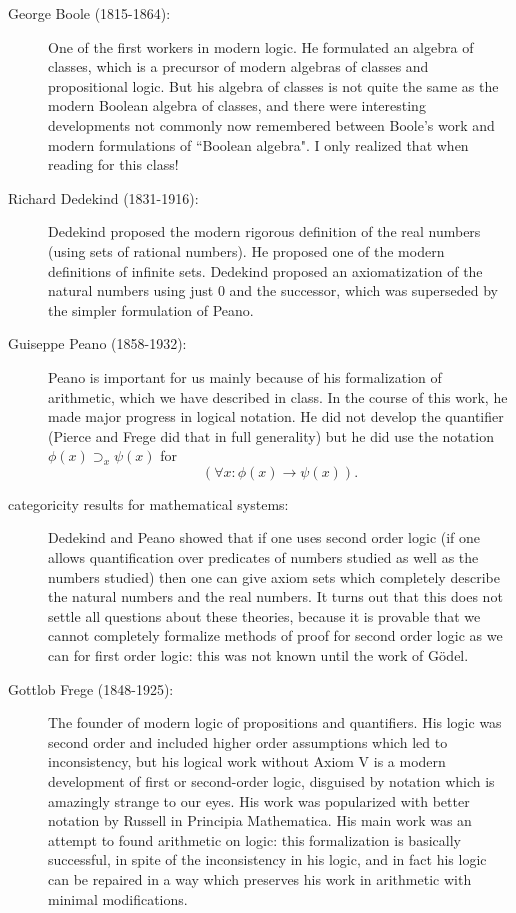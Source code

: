 \documentclass[12pt]{article}
\begin{document}
\begin{description}
\item[George Boole (1815-1864):]  One of the first workers in modern logic.  He formulated an algebra of classes, which is a precursor of modern algebras of classes and propositional logic.
But his algebra of classes is not quite the same as the modern Boolean algebra of classes, and there were interesting developments not commonly now remembered between Boole's work and modern formulations of ``Boolean algebra".  I only realized that when reading for this class!

\item[Richard Dedekind (1831-1916):]  Dedekind proposed the modern rigorous definition of the real numbers (using sets of rational numbers).  He proposed one of the modern definitions of infinite sets.  Dedekind proposed an axiomatization of the natural numbers using just 0 and the successor, which was superseded by the simpler formulation of Peano.

\item[Guiseppe Peano (1858-1932):]  Peano is important for us mainly because of his formalization of arithmetic, which we have described in class.  In the course of this work, he made major progress in logical notation.  He did not develop the quantifier (Pierce and Frege did that in full generality) but he did use the notation $\phi(x) \supset_x \psi(x)$ for $$(\forall x:\phi(x) \rightarrow \psi(x)).$$

\item[categoricity results for mathematical systems:]  Dedekind and Peano showed that if one uses second order logic (if one allows quantification over predicates of numbers studied as well as the numbers studied) then one can give axiom sets which completely describe the natural numbers and the real numbers.  It turns out that this does not settle all questions about these theories, because it is provable that we cannot completely formalize methods of proof for second order logic as we can for first order logic:  this was not known until the work of G\"odel.

\item[Gottlob Frege (1848-1925):]  The founder of modern logic of propositions and quantifiers.  His logic was second order and included higher order assumptions which led to inconsistency,
but his logical work without Axiom V is a modern development of first or second-order logic, disguised by notation which is amazingly strange to our eyes.  His work was popularized with better notation by Russell in Principia Mathematica.  His main work was an attempt to found arithmetic on logic:  this formalization is basically successful, in spite of the inconsistency in his logic, and in fact his logic can be repaired in a way which preserves his work in arithmetic with minimal modifications.


\end{description}
\end{document}
